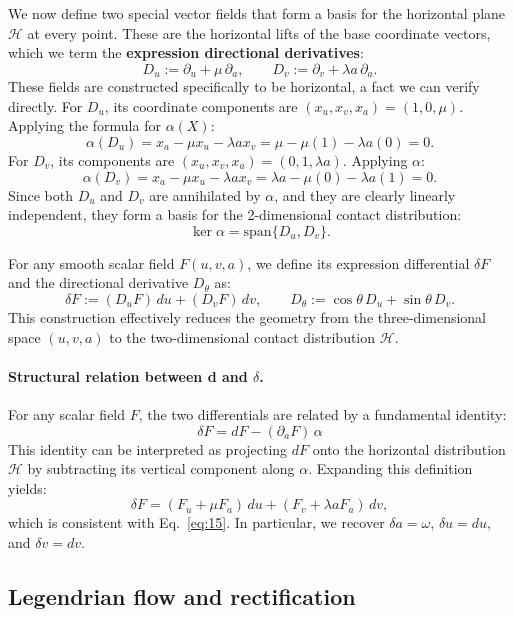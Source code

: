 We now define two special vector fields that form a basis for the horizontal plane $\mathcal{H}$ at every point. These are the horizontal lifts of the base coordinate vectors, which we term the \textbf{expression directional derivatives}:
\begin{equation}\label{eq:directional_derivatives}
D_u := \partial_u + \mu\,\partial_a, \qquad D_v := \partial_v + \lambda a\,\partial_a.
\end{equation}
These fields are constructed specifically to be horizontal, a fact we can verify directly. For $D_u$, its coordinate components are $(x_u, x_v, x_a) = (1, 0, \mu)$. Applying the formula for $\alpha(X)$:
\[
\alpha(D_u) = x_a - \mu x_u - \lambda a x_v = \mu - \mu(1) - \lambda a(0) = 0.
\]
For $D_v$, its components are $(x_u, x_v, x_a) = (0, 1, \lambda a)$. Applying $\alpha$:
\[
\alpha(D_v) = x_a - \mu x_u - \lambda a x_v = \lambda a - \mu(0) - \lambda a(1) = 0.
\]
Since both $D_u$ and $D_v$ are annihilated by $\alpha$, and they are clearly linearly independent, they form a basis for the 2-dimensional contact distribution:
\[
\ker\alpha = \text{span}\{D_u, D_v\}.
\]

For any smooth scalar field $F(u,v,a)$, we define its expression differential $\delta F$ and the directional derivative $D_\theta$ as:
\begin{equation}\label{eq:3}\tag{3}
\delta F := (D_uF)\,du + (D_vF)\,dv, \qquad D_\theta := \cos\theta\,D_u + \sin\theta\,D_v.
\end{equation}
This construction effectively reduces the geometry from the three-dimensional space $(u,v,a)$ to the two-dimensional contact distribution $\mathcal{H}$.

\paragraph{Structural relation between d and $\delta$.}
For any scalar field $F$, the two differentials are related by a fundamental identity:
\[
\boxed{ \delta F = dF - (\partial_a F)\,\alpha }
\]
This identity can be interpreted as projecting $dF$ onto the horizontal distribution $\mathcal{H}$ by subtracting its vertical component along $\alpha$. Expanding this definition yields:
\[
\delta F = (F_u + \mu F_a)\,du + (F_v + \lambda a F_a)\,dv,
\]
which is consistent with Eq.~\eqref{eq:15}. In particular, we recover $\delta a = \omega$, $\delta u = du$, and $\delta v = dv$.

\subsection{Legendrian flow and rectification}

